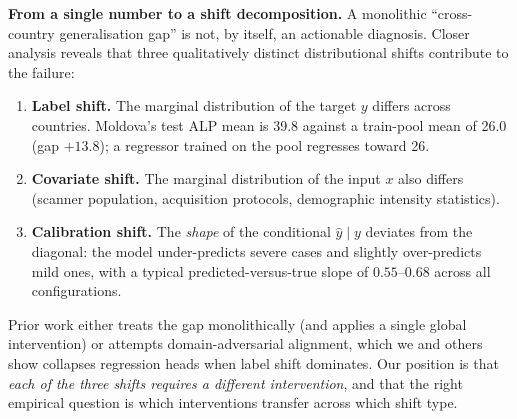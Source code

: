 \documentclass[runningheads]{llncs}
\begin{document}
\smallskip\noindent\textbf{From a single number to a shift decomposition.}
A monolithic ``cross-country generalisation gap'' is not, by itself, an actionable diagnosis. Closer analysis reveals that three qualitatively distinct distributional shifts contribute to the failure:
\begin{enumerate}
\item \textbf{Label shift.} The marginal distribution of the target $y$ differs across countries. Moldova's test ALP mean is 39.8 against a train-pool mean of 26.0 (gap $+13.8$); a regressor trained on the pool regresses toward 26.
\item \textbf{Covariate shift.} The marginal distribution of the input $x$ also differs (scanner population, acquisition protocols, demographic intensity statistics).
\item \textbf{Calibration shift.} The \emph{shape} of the conditional $\hat{y} \mid y$ deviates from the diagonal: the model under-predicts severe cases and slightly over-predicts mild ones, with a typical predicted-versus-true slope of $0.55$--$0.68$ across all configurations.
\end{enumerate}
Prior work either treats the gap monolithically (and applies a single global intervention) or attempts domain-adversarial alignment, which we and others~\cite{gulrajani2021domainbed} show collapses regression heads when label shift dominates. Our position is that \emph{each of the three shifts requires a different intervention}, and that the right empirical question is which interventions transfer across which shift type.
\end{document}
